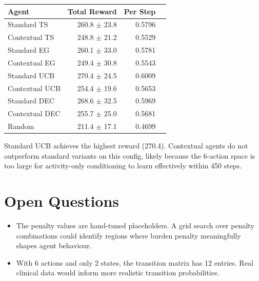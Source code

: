 \documentclass[11pt]{article}
\begin{document}
\begin{center}
\begin{tabular}{lrrr}
\toprule
Agent & Total Reward & Per Step \\
\midrule
Standard TS & 260.8 $\pm$ 23.8 & 0.5796 \\
Contextual TS & 248.8 $\pm$ 21.2 & 0.5529 \\
Standard EG & 260.1 $\pm$ 33.0 & 0.5781 \\
Contextual EG & 249.4 $\pm$ 30.8 & 0.5543 \\
Standard UCB & 270.4 $\pm$ 24.5 & 0.6009 \\
Contextual UCB & 254.4 $\pm$ 19.6 & 0.5653 \\
Standard DEC & 268.6 $\pm$ 32.5 & 0.5969 \\
Contextual DEC & 255.7 $\pm$ 25.0 & 0.5681 \\
Random & 211.4 $\pm$ 17.1 & 0.4699 \\
\bottomrule
\end{tabular}
\end{center}

Standard UCB achieves the highest reward (270.4). Contextual agents do not
outperform standard variants on this config, likely because the 6-action
space is too large for activity-only conditioning to learn effectively
within 450 steps.

\section{Open Questions}

\begin{itemize}
\item The penalty values are hand-tuned placeholders. A grid search over
penalty combinations could identify regions where burden penalty meaningfully
shapes agent behaviour.
\item With 6 actions and only 2 states, the transition matrix has 12 entries.
Real clinical data would inform more realistic transition probabilities.
\end{itemize}
\end{document}
